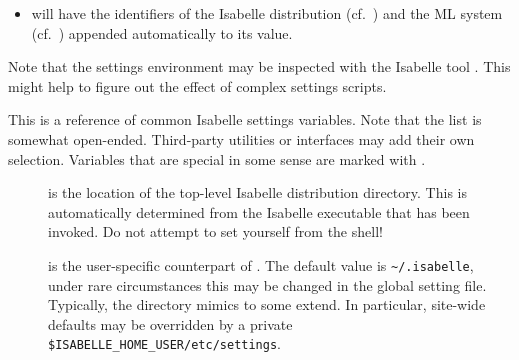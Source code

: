 \begin{isabellebody}
\begin{isamarkuptext}
\begin{itemize}
  \item {}\hyperlink{setting.ISABELLE-OUTPUT}{\mbox{}} will have the identifiers of
  the Isabelle distribution (cf.\ \hyperlink{setting.ISABELLE-IDENTIFIER}{\mbox{}}) and
  the ML system (cf.\ \hyperlink{setting.ML-IDENTIFIER}{\mbox{}}) appended automatically
  to its value.

  \end{itemize}

  \medskip Note that the settings environment may be inspected with
  the Isabelle tool \hyperlink{tool.getenv}{\mbox{}}.  This might help to figure out the
  effect of complex settings scripts.%
\end{isamarkuptext}%
\isamarkuptrue%
%
\isamarkuptrue%
%
\begin{isamarkuptext}%
This is a reference of common Isabelle settings variables. Note that
  the list is somewhat open-ended. Third-party utilities or interfaces
  may add their own selection. Variables that are special in some
  sense are marked with \isa{{\isachardoublequote}\isactrlsup {\isacharasterisk}{\isachardoublequote}}.

  \begin{description}

  \item[\hypertarget{setting.ISABELLE-HOME}{\hyperlink{setting.ISABELLE-HOME}{\mbox{}}}\isa{{\isachardoublequote}\isactrlsup {\isacharasterisk}{\isachardoublequote}}] is the
  location of the top-level Isabelle distribution directory. This is
  automatically determined from the Isabelle executable that has been
  invoked.  Do not attempt to set \hyperlink{setting.ISABELLE-HOME}{\mbox{}} yourself
  from the shell!
  
  \item[\hypertarget{setting.ISABELLE-HOME-USER}{\hyperlink{setting.ISABELLE-HOME-USER}{\mbox{}}}] is the user-specific
  counterpart of \hyperlink{setting.ISABELLE-HOME}{\mbox{}}. The default value is
  \verb|~/.isabelle|, under rare circumstances this may be
  changed in the global setting file.  Typically, the \hyperlink{setting.ISABELLE-HOME-USER}{\mbox{}} directory mimics \hyperlink{setting.ISABELLE-HOME}{\mbox{}} to
  some extend. In particular, site-wide defaults may be overridden by
  a private \verb|$ISABELLE_HOME_USER/etc/settings|.
  

\end{description}
\end{isamarkuptext}
\end{isabellebody}
